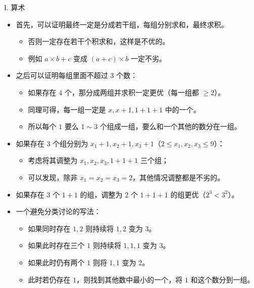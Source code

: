 \documentclass[9pt]{ctexbeamer}
\newcommand{\setParDis}{\setlength{\parskip}{6pt}}
\begin{document}
\begin{frame}
\setParDis

I. 算术

\begin{itemize}
	\item 首先，可以证明最终一定是分成若干组，每组分别求和，最终求积。
		\begin{itemize}
			\item 否则一定存在若干个积求和，这样是不优的。
			\item 例如 $a \times b + c$ 变成 $(a + c) \times b$ 一定不劣。
		\end{itemize}
	\item 之后可以证明每组里面不超过 $3$ 个数：
		\begin{itemize}
			\item 如果存在 $4$ 个，那分成两组并求积一定更优（每一组都 $\geq 2$）。
			\item 同理可得，每一组一定是 $x,x+1,1+1+1$ 中的一个。
			\item 所以每个 $1$ 要么 $1\sim 3$ 个组成一组，要么和一个其他的数分在一组。
		\end{itemize}
	\item 如果存在 $3$ 个组分别为 $x_1+1,x_2+1,x_3+1$（$2 \le x_1, x_2, x_3 \le 9$）：
		\begin{itemize}
			\item 考虑将其调整为 $x_1,x_2,x_3,1+1+1$ 三个组；
			\item 可以发现，除非 $x_1=x_2=x_3=2$，其他情况调整都是不劣的。
		\end{itemize}
		\item 如果存在 $3$ 个 $1+1$ 的组，调整为 $2$ 个 $1+1+1$ 的组更优（$2 ^ 3 < 3 ^ 2$）。
\end{itemize}

\end{frame}

\begin{frame}
\setParDis

\begin{itemize}
	\item 一个避免分类讨论的写法：
		\begin{itemize}
			\item 如果同时存在 $1,2$ 则持续将 $1,2$ 变为 $3$。
			\item 如果此时存在三个 $1$ 则持续将 $1,1,1$ 变为 $3$。
			\item 如果此时仍有两个 $1$ 则将 $1,1$ 变为 $2$。
			\item 此时若仍存在 $1$，则找到其他数中最小的一个，将 $1$ 和这个数分到一组。
		\end{itemize}
\end{itemize}
\end{frame}
\end{document}
